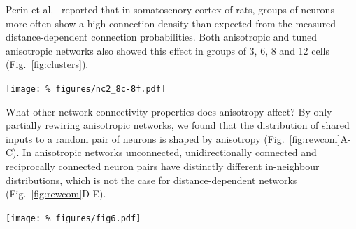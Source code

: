 Perin et al.~\cite{Perin2011} reported that in somatosenory cortex of
rats, groups of neurons more often show a high connection density than
expected from the measured distance-dependent connection
probabilities. Both anisotropic and tuned anisotropic networks also
showed this effect in groups of 3, 6, 8 and 12 cells
(Fig.~\ref{fig:clusters}).

\begin{center}\vspace{0.01cm}
  \texttt{[image: \%
    figures/nc2\_8c-8f.pdf]} 
  \label{fig:clusters}
\end{center}\vspace{2cm}

What other network connectivity properties does anisotropy affect? By
only partially rewiring anisotropic networks, we found that the
distribution of shared inputs to a random pair of neurons is shaped by
anisotropy (Fig.~\ref{fig:rewcom}A-C). In anisotropic networks
unconnected, unidirectionally connected and reciprocally connected
neuron pairs have distinctly different in-neighbour distributions,
which is not the case for distance-dependent networks
(Fig.~\ref{fig:rewcom}D-E).

\begin{center}\vspace{0.01cm}
  \texttt{[image: \%
    figures/fig6.pdf]} 
  \label{fig:rewcom}
\end{center}\vspace{2cm}

\vspace{-1.25cm}
